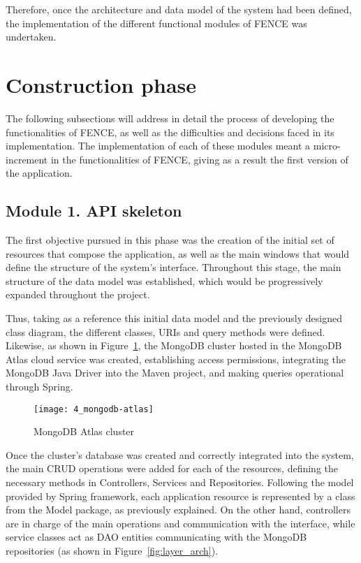 Therefore, once the architecture and data model of the system had been defined, the implementation of the different functional modules of FENCE was undertaken.

\section{Construction phase}

The following subsections will address in detail the process of developing the functionalities of FENCE, as well as the difficulties and decisions faced in its implementation. The implementation of each of these modules meant a micro-increment in the functionalities of FENCE, giving as a result the first version of the application.

\subsection{Module 1. API skeleton}

The first objective pursued in this phase was the creation of the initial set of resources that compose the application, as well as the main windows that would define the structure of the system's interface. Throughout this stage, the main structure of the data model was established, which would be progressively expanded throughout the project.

Thus, taking as a reference this initial data model and the previously designed class diagram, the different classes, URIs and query methods were defined. Likewise, as shown in Figure~\ref{fig:mongodb-cluster}, the MongoDB cluster hosted in the MongoDB Atlas cloud service was created, establishing access permissions, integrating the MongoDB Java Driver into the Maven project, and making queries operational through Spring.

\begin{figure}
	\centering
	\texttt{[image: 4\_mongodb-atlas]}
	\caption[MongoDB Atlas cluster]{MongoDB Atlas cluster}
	\label{fig:mongodb-cluster}
\end{figure}

Once the cluster’s database was created and correctly integrated into the system, the main CRUD operations were added for each of the resources, defining the necessary methods in Controllers, Services and Repositories. Following the model provided by Spring framework, each application resource is represented by a class from the Model package, as previously explained. On the other hand, controllers are in charge of the main operations and communication with the interface, while service classes act as DAO entities communicating with the MongoDB repositories (as shown in Figure~\ref{fig:layer_arch}).

